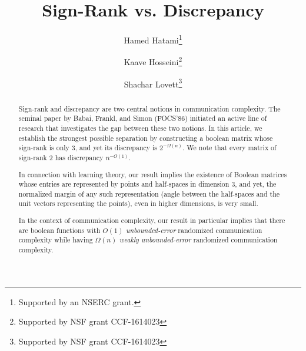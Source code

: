 \documentclass{toc}
\begin{document}
\begin{frontmatter} %
  
%
%

%
%

\title{Sign-Rank vs. Discrepancy}

%
%
%
%
%
%
%
%
%
%
%
%


%
%
%
%

%
\author[hatami]{Hamed Hatami\thanks{Supported by an NSERC grant.}}
\author[hosseini]{Kaave Hosseini\thanks{Supported by NSF grant CCF-1614023}}
\author[lovett]{Shachar Lovett\thanks{Supported by NSF grant CCF-1614023}}

%
%
%
%

%
%
%
%
%
%
\begin{abstract}
Sign-rank and discrepancy are two central notions in communication complexity.
The seminal %
paper by  %
Babai, Frankl, and Simon %
(FOCS'86)   %
initiated an active line of research that investigates  the gap between these
two notions.
In this article, we establish the strongest possible separation by constructing a boolean matrix whose sign-rank is only $3$, and yet its discrepancy is  $2^{-\Omega(n)}$. We note that every matrix of sign-rank $2$ has discrepancy $n^{-O(1)}$.

In connection %
with   %
learning theory, our result implies the existence of Boolean  matrices whose
entries are represented by points and half-spaces in dimension $3$, and yet,
the normalized margin of any such representation
%
(angle between the half-spaces and the unit vectors representing
the points),  %
even in higher dimensions, is
%
%
very small.  %

In the context of communication complexity, our result in particular implies that there are boolean functions with $O(1)$ \emph{unbounded-error} randomized communication complexity while having $\Omega(n)$ \emph{weakly unbounded-error} randomized communication complexity.
\end{abstract}

%

\end{frontmatter}

%
%
%
\end{document}
